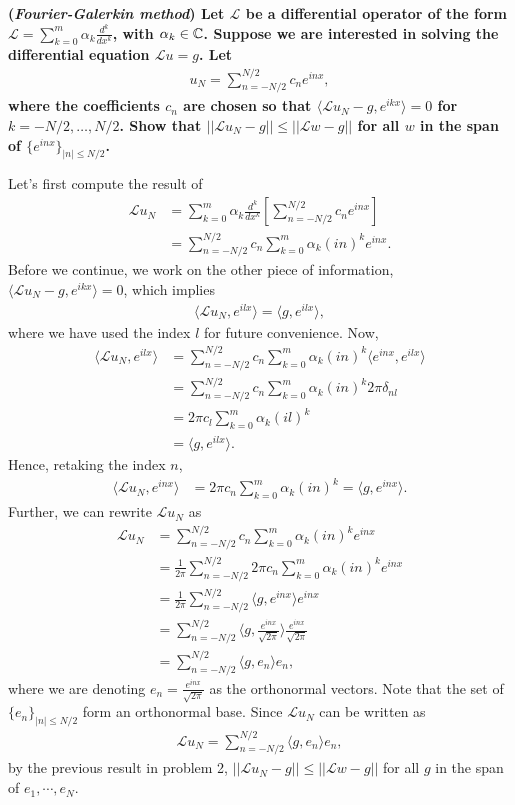 \textbf{(\textit{Fourier-Galerkin method}) Let $\mathcal{L}$ be a differential operator of the form $\mathcal{L} = \sum_{k=0}^m \alpha_k\frac{d^k}{dx^k}$, with $\alpha_k\in\mathbb{C}$. Suppose we are interested in solving the differential equation $\mathcal{L}u=g$. Let
\begin{align*}
u_N=\sum_{n=-N/2}^{N/2}c_ne^{inx},
\end{align*}
where the coefficients $c_n$ are chosen so that $\langle\mathcal{L}u_N-g,e^{ikx}\rangle=0$ for $k=-N/2,\dots,N/2$. Show that $||\mathcal{L}u_N-g||\leq ||\mathcal{L}w-g||$ for all $w$ in the span of $\{e^{inx}\}_{|n|\leq N/2}$.}
\newline

Let's first compute the result of
\begin{align*}
\mathcal{L}u_N &= \sum_{k=0}^m \alpha_k\frac{d^k}{dx^k}\left[\sum_{n=-N/2}^{N/2}c_ne^{inx}\right]\\
&=\sum_{n=-N/2}^{N/2}c_n\sum_{k=0}^m \alpha_k(in)^ke^{inx}.
\end{align*}
Before we continue, we work on the other piece of information, $\langle\mathcal{L}u_N-g,e^{ikx}\rangle=0$, which implies
\begin{align*}
\langle\mathcal{L}u_N,e^{ilx}\rangle=\langle g,e^{ilx}\rangle,
\end{align*}
where we have used the index $l$ for future convenience. Now,
\begin{align*}
\langle\mathcal{L}u_N,e^{ilx}\rangle &= \sum_{n=-N/2}^{N/2}c_n\sum_{k=0}^m \alpha_k(in)^k\langle e^{inx},e^{ilx}\rangle\\
&= \sum_{n=-N/2}^{N/2}c_n\sum_{k=0}^m \alpha_k(in)^k2\pi \delta_{nl}\\
&= 2\pi c_l\sum_{k=0}^m \alpha_k(il)^k\\
&= \langle g,e^{ilx}\rangle.
\end{align*}
Hence, retaking the index $n$,
\begin{align*}
\langle\mathcal{L}u_N,e^{inx}\rangle &= 2\pi c_n\sum_{k=0}^m \alpha_k(in)^k = \langle g,e^{inx}\rangle.
\end{align*}
Further, we can rewrite  $\mathcal{L}u_N$ as
\begin{align*}
\mathcal{L}u_N &= \sum_{n=-N/2}^{N/2}c_n\sum_{k=0}^m \alpha_k(in)^ke^{inx}\\
&= \frac{1}{2\pi}\sum_{n=-N/2}^{N/2}2\pi c_n\sum_{k=0}^m \alpha_k(in)^ke^{inx}\\
&= \frac{1}{2\pi}\sum_{n=-N/2}^{N/2} \langle g,e^{inx}\rangle e^{inx}\\
&= \sum_{n=-N/2}^{N/2} \langle g,\frac{e^{inx}}{\sqrt{2\pi}}\rangle \frac{e^{inx}}{\sqrt{2\pi}}\\
&= \sum_{n=-N/2}^{N/2} \langle g,e_n\rangle e_n,
\end{align*}
where we are denoting $e_n=\frac{e^{inx}}{\sqrt{2\pi}}$ as the orthonormal vectors. Note that the set of $\{e_n\}_{|n|\leq N/2}$ form an orthonormal base. Since $\mathcal{L}u_N$ can be written as
\begin{align*}
\mathcal{L}u_N = \sum_{n=-N/2}^{N/2} \langle g,e_n\rangle e_n,
\end{align*}
by the previous result in problem 2, $||\mathcal{L}u_N-g||\leq||\mathcal{L}w-g||$ for all $g$ in the span of $e_1, \cdots, e_N$. 